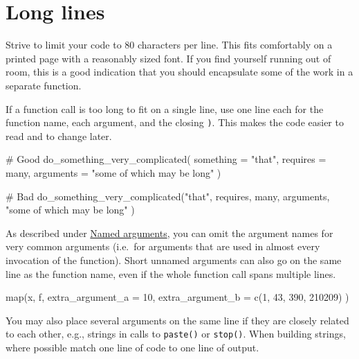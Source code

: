 \documentclass[twoside, pagesize, fontsize=11pt, dvipsnames]{scrreport} %
\newenvironment{Shaded}{\begin{snugshade}}{\end{snugshade}}
\newcommand{\AttributeTok}[1]{\textcolor[rgb]{0.40,0.45,0.13}{#1}}
\newcommand{\CommentTok}[1]{\textcolor[rgb]{0.37,0.37,0.37}{#1}}
\newcommand{\DecValTok}[1]{\textcolor[rgb]{0.68,0.00,0.00}{#1}}
\newcommand{\FunctionTok}[1]{\textcolor[rgb]{0.28,0.35,0.67}{#1}}
\newcommand{\NormalTok}[1]{\textcolor[rgb]{0.00,0.23,0.31}{#1}}
\newcommand{\StringTok}[1]{\textcolor[rgb]{0.13,0.47,0.30}{#1}}
\begin{document}
\hypertarget{long-lines}{%
\section{Long lines}\label{long-lines}}

Strive to limit your code to 80 characters per line. This fits
comfortably on a printed page with a reasonably sized font. If you find
yourself running out of room, this is a good indication that you should
encapsulate some of the work in a separate function.

If a function call is too long to fit on a single line, use one line
each for the function name, each argument, and the closing \texttt{)}.
This makes the code easier to read and to change later.

\begin{Shaded}
\begin{Highlighting}[]
\CommentTok{\# Good}
\FunctionTok{do\_something\_very\_complicated}\NormalTok{(}
  \AttributeTok{something =} \StringTok{"that"}\NormalTok{,}
  \AttributeTok{requires =}\NormalTok{ many,}
  \AttributeTok{arguments =} \StringTok{"some of which may be long"}
\NormalTok{)}

\CommentTok{\# Bad}
\FunctionTok{do\_something\_very\_complicated}\NormalTok{(}\StringTok{"that"}\NormalTok{, requires, many, arguments,}
                              \StringTok{"some of which may be long"}
\NormalTok{                              )}
\end{Highlighting}
\end{Shaded}

As described under \protect\hyperlink{argument-names}{Named arguments},
you can omit the argument names for very common arguments (i.e.~for
arguments that are used in almost every invocation of the function).
Short unnamed arguments can also go on the same line as the function
name, even if the whole function call spans multiple lines.

\begin{Shaded}
\begin{Highlighting}[]
\FunctionTok{map}\NormalTok{(x, f,}
  \AttributeTok{extra\_argument\_a =} \DecValTok{10}\NormalTok{,}
  \AttributeTok{extra\_argument\_b =} \FunctionTok{c}\NormalTok{(}\DecValTok{1}\NormalTok{, }\DecValTok{43}\NormalTok{, }\DecValTok{390}\NormalTok{, }\DecValTok{210209}\NormalTok{)}
\NormalTok{)}
\end{Highlighting}
\end{Shaded}

You may also place several arguments on the same line if they are
closely related to each other, e.g., strings in calls to
\texttt{paste()} or \texttt{stop()}. When building strings, where
possible match one line of code to one line of output.
\end{document}
